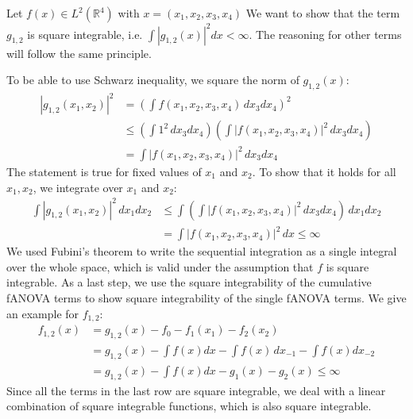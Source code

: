 Let $f(x) \in L^2(\mathbb{R}^4)$ with $x = (x_1, x_2, x_3, x_4)$
We want to show that the term $g_{1,2}$ is square integrable, i.e. $\int |g_{1,2}(x)|^2 dx < \infty$. The reasoning for other terms will follow the same principle.\par
To be able to use Schwarz inequality, we square the norm of $g_{1,2}(x)$:
\begin{align}
    |g_{1,2}(x_1, x_2)|^2 
    &= \left( \int f(x_1, x_2, x_3, x_4) \, dx_3 dx_4 \right)^2 \\
    &\leq ( \int 1^2 \, dx_3 dx_4) (\int |f(x_1, x_2, x_3, x_4)|^2 \, dx_3 dx_4) \\
    &= \int |f(x_1, x_2, x_3, x_4)|^2 \, dx_3 dx_4
\end{align}
The statement is true for fixed values of $x_1$ and $x_2$. To show that it holds for all $x_1, x_2$, we integrate over $x_1$ and $x_2$:
\begin{align}
    \int |g_{1,2}(x_1, x_2)|^2 \, dx_1 dx_2 
    &\leq \int \left( \int |f(x_1, x_2, x_3, x_4)|^2 \, dx_3 dx_4 \right) \, dx_1 dx_2 \\
    &= \int |f(x_1, x_2, x_3, x_4)|^2 \, dx \leq \infty
\end{align}
We used Fubini's theorem to write the sequential integration as a single integral over the whole space, which is valid under the assumption that $f$ is square integrable.
As a last step, we use the square integrability of the cumulative fANOVA terms to show square integrability of the single fANOVA terms. We give an example for $f_{1,2}$:
\begin{align}
    f_{1,2}(x) &= g_{1,2}(x) - f_0 - f_1(x_1) - f_2(x_2) \\
    &= g_{1,2}(x) - \int f(x) dx - \int f(x)\, dx_{-1} - \int f(x) dx_{-2} \\
    &= g_{1,2}(x) - \int f(x) dx - g_1(x) - g_2(x) \leq \infty
\end{align}
Since all the terms in the last row are square integrable, we deal with a linear combination of square integrable functions, which is also square integrable.
